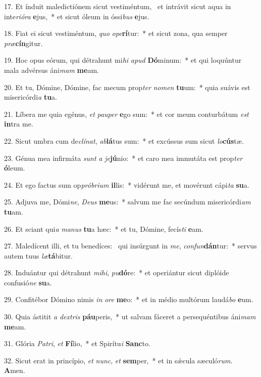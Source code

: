 17. Et índuit maledictiónem sicut vestiméntum, \dag\  et intrávit sicut aqua in inte\textit{ri}\textit{ó}\textit{ra} \textbf{e}jus,~*  et sicut óleum in óssi\textit{bus} \textbf{e}jus.\

18. Fiat ei sicut vestiméntum, \textit{quo} \textit{o}\textit{pe}\textbf{rí}tur:~*  et sicut zona, qua semper \textit{præ}\textbf{cín}gitur.\

19. Hoc opus eórum, qui détrahunt mi\textit{hi} \textit{a}\textit{pud} \textbf{Dó}minum:~*  et qui loquúntur mala advérsus áni\textit{mam} \textbf{me}am.\

20. Et tu, Dómine, Dómine, fac mecum prop\textit{ter} \textit{no}\textit{men} \textbf{tu}um:~*  quia suávis est misericórdi\textit{a} \textbf{tu}a.\

21. Líbera me quia egénus, \textit{et} \textit{pau}\textit{per} \textbf{e}go sum:~*  et cor meum conturbátum \textit{est} \textbf{in}tra me.\

22. Sicut umbra cum de\textit{clí}\textit{nat}, \textit{ab}\textbf{lá}tus sum:~*  et excússus sum sicut \textit{lo}\textbf{cús}tæ.\

23. Génua mea infirmáta \textit{sunt} \textit{a} \textit{je}\textbf{jú}nio:~*  et caro mea immutáta est prop\textit{ter} \textbf{ó}leum.\

24. Et ego factus sum op\textit{pró}\textit{bri}\textit{um} \textbf{il}lis:~*  vidérunt me, et movérunt cápi\textit{ta} \textbf{su}a.\

25. Adjuva me, Dómi\textit{ne}, \textit{De}\textit{us} \textbf{me}us:~*  salvum me fac secúndum misericórdi\textit{am} \textbf{tu}am.\

26. Et sciant qui\textit{a} \textit{ma}\textit{nus} \textbf{tu}a hæc:~*  et tu, Dómine, fecís\textit{ti} \textbf{e}am.\

27. Maledícent illi, et tu benedíces: \dag\  qui insúrgunt in \textit{me}, \textit{con}\textit{fun}\textbf{dán}tur:~*  servus autem tuus \textit{læ}\textbf{tá}bitur.\

28. Induántur qui détrahunt \textit{mi}\textit{hi}, \textit{pu}\textbf{dó}re:~*  et operiántur sicut diplóide confusió\textit{ne} \textbf{su}a.\

29. Confitébor Dómino nimis \textit{in} \textit{o}\textit{re} \textbf{me}o:~*  et in médio multórum laudá\textit{bo} \textbf{e}um.\

30. Quia ástitit \textit{a} \textit{dex}\textit{tris} \textbf{páu}peris,~*  ut salvam fáceret a persequéntibus áni\textit{mam} \textbf{me}am.\

31. Glória \textit{Pa}\textit{tri}, \textit{et} \textbf{Fí}lio,~*  et Spirítu\textit{i} \textbf{Sanc}to.\

32. Sicut erat in princípio, \textit{et} \textit{nunc}, \textit{et} \textbf{sem}per,~*  et in sǽcula sæculó\textit{rum}. \textbf{A}men.\


